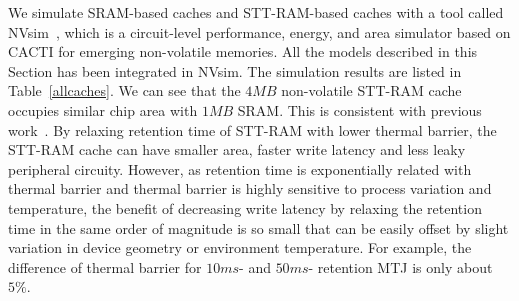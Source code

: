 We simulate SRAM-based caches and STT-RAM-based caches with a tool called NVsim~\cite{CACTI:PCRAMsim}, which is a circuit-level performance, energy, and area simulator based on CACTI for emerging non-volatile memories. All the models described in this Section has been integrated in NVsim. The simulation results are listed in Table~\ref{allcaches}. We can see that the $4MB$ non-volatile STT-RAM cache occupies similar chip area with $1MB$ SRAM. This is consistent with previous work~\cite{CACTI:DAC08:Dong}. By relaxing retention time of STT-RAM with lower thermal barrier, the STT-RAM cache can have smaller area, faster write latency and less leaky peripheral circuity. However, as retention time is exponentially related with thermal barrier and thermal barrier is highly sensitive to process variation and temperature, the benefit of decreasing write latency by relaxing the retention time in the same order of magnitude is so small that can be easily offset by slight variation in device geometry or environment temperature. For example, the difference of thermal barrier for $10ms$- and $50ms$- retention MTJ is only about $5\%$.

